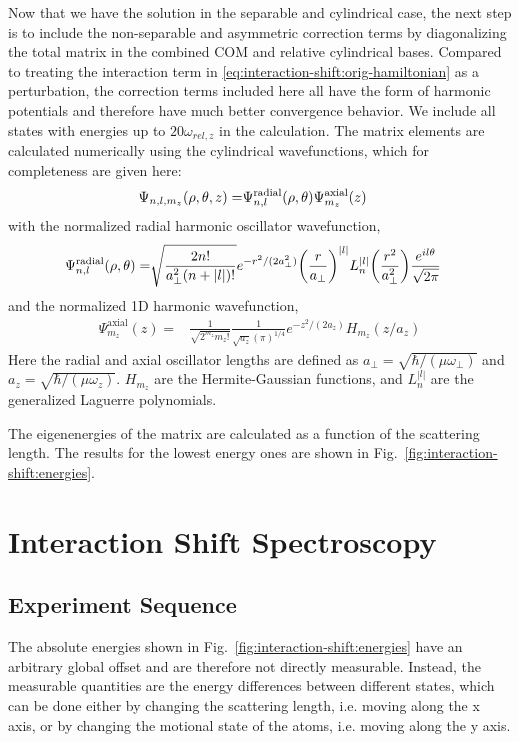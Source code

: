 Now that we have the solution in the separable and cylindrical case,
the next step is to include the non-separable and asymmetric correction terms
by diagonalizing the total matrix in the combined COM and relative cylindrical bases.
Compared to treating the interaction term in \ref{eq:interaction-shift:orig-hamiltonian}
as a perturbation, the correction terms included here all have the form of
harmonic potentials and therefore have much better convergence behavior.
We include all states with energies up to $20 \omega_{rel,z}$ in the calculation.
The matrix elements are calculated numerically using the cylindrical wavefunctions,
which for completeness are given here:
\begin{align*}
  \Psi_{n,l,m_z}{\left({\rho,\theta,z}\right)}=
  &\Psi^{\mathrm{radial}}_{n,l}{\left({\rho, \theta}\right)}\Psi^{\mathrm{axial}}_{m_z}{\left({z}\right)}
\end{align*}
with the normalized radial harmonic oscillator wavefunction,
\begin{align*}
  \Psi^{\mathrm{radial}}_{n,l}{\left({\rho, \theta}\right)}=
  &\sqrt{\frac{2n!}{a_\perp^2 (n+|l|)!}} e^{-r^2/(2 a_\perp^2)} {\left({\frac{r}{a_\perp}}\right)}^{|l|}
    L_n^{|l|}{\left({\frac{r^2}{a_\perp^2}}\right)} \frac{ e^{i l \theta}}{\sqrt{2 \pi}}
\end{align*}
and the normalized 1D harmonic wavefunction,
\begin{align*}
  \Psi^{\mathrm{axial}}_{m_z}(z)=&\frac{1}{\sqrt{2^{m_z} m_z!}} \frac{1}{\sqrt{a_z}(\pi)^{1/4}}
                                   e^{-z^2/(2 a_z)} H_{m_z}( z/a_z)
\end{align*}
Here the radial and axial oscillator lengths are defined as
$a_\perp = \sqrt{\hbar/( \mu \omega_\perp)}$ and $a_z = \sqrt{\hbar/ (\mu \omega_z)}$.
$H_{m_z}$ are the Hermite-Gaussian functions,
and $L^{|l|}_n$ are the generalized Laguerre polynomials.

The eigenenergies of the matrix are calculated as a function of the scattering length.
The results for the lowest energy ones are shown in Fig.~\ref{fig:interaction-shift:energies}.

\section{Interaction Shift Spectroscopy}

\subsection{Experiment Sequence}
The absolute energies shown in Fig.~\ref{fig:interaction-shift:energies} have an arbitrary global
offset and are therefore not directly measurable.
Instead, the measurable quantities are the energy differences between different states,
which can be done either by changing the scattering length, i.e. moving along the x axis,
or by changing the motional state of the atoms, i.e. moving along the y axis.

